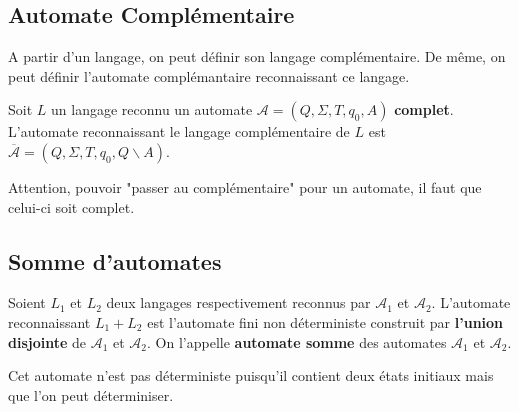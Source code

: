 \subsection{Automate Complémentaire}

A partir d'un langage, on peut définir son langage complémentaire. De même, on peut définir l'automate complémantaire 
reconnaissant ce langage. 

\begin{definition}
    Soit $L$ un langage reconnu un automate $ \mathcal{A} = (Q,\Sigma,T,q_0,A)$ \textbf{complet}. 
    L'automate reconnaissant le langage complémentaire de $L$ est $ \overline{ \mathcal{A}} = (Q,\Sigma,T,q_0,Q \backslash A)$. 
\end{definition}

\begin{remark}
    Attention, pouvoir "passer au complémentaire" pour un automate, il faut que celui-ci soit complet. 
\end{remark}


\subsection{Somme d'automates}

\begin{definition}
    Soient $L_1$ et $L_2$ deux langages respectivement reconnus par $ \mathcal{A}_1$ et $ \mathcal{A}_2$. 
    L'automate reconnaissant $L_1 + L_2$ est l'automate fini non déterministe construit par \textbf{l'union disjointe}
    de $ \mathcal{A}_1$ et $ \mathcal{ A}_2$. On l'appelle \textbf{automate somme} des automates $ \mathcal{A}_1$ 
    et $ \mathcal{A}_2$. 
\end{definition}

Cet automate n'est pas déterministe puisqu'il contient deux états initiaux mais que l'on peut déterminiser. 

